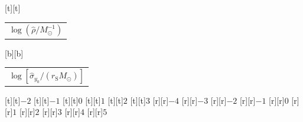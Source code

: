%    
%
%
\begin{psfrags}%
\psfragscanon%
%
[t][t]{\color[rgb]{0,0,0}\setlength{\tabcolsep}{0pt}\begin{tabular}{c}{\Large$\log\left(\hat{\rho}/M_\odot^{-1}\right)$}\end{tabular}}%
[b][b]{\color[rgb]{0,0,0}\setlength{\tabcolsep}{0pt}\begin{tabular}{c}{\Large$\log\left[\hat{\sigma}_{y_0}/\left(r_\mathrm{S} M_\odot\right)\right]$}\end{tabular}}%
%
[t][t]{$-2$}%
[t][t]{$-1$}%
[t][t]{$0$}%
[t][t]{$1$}%
[t][t]{$2$}%
[t][t]{$3$}%
%
[r][r]{$-4$}%
[r][r]{$-3$}%
[r][r]{$-2$}%
[r][r]{$-1$}%
[r][r]{$0$}%
[r][r]{$1$}%
[r][r]{$2$}%
[r][r]{$3$}%
[r][r]{$4$}%
[r][r]{$5$}%
%
%
\end{psfrags}%
%
